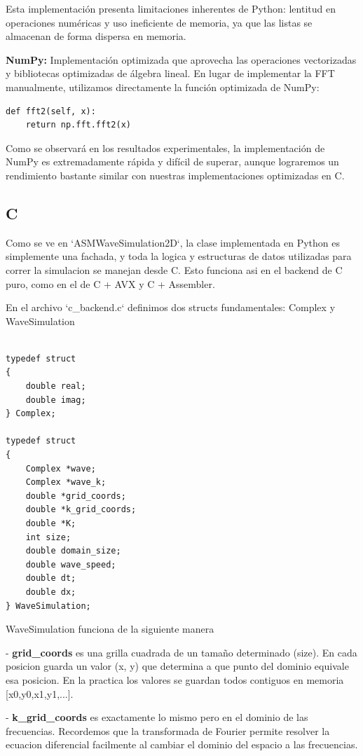 \documentclass[a4paper]{article}
\begin{document}
Esta implementación presenta limitaciones inherentes de Python: lentitud en operaciones numéricas y uso ineficiente de memoria, ya que las listas se almacenan de forma dispersa en memoria.

\textbf{NumPy:} Implementación optimizada que aprovecha las operaciones vectorizadas y bibliotecas optimizadas de álgebra lineal. En lugar de implementar la FFT manualmente, utilizamos directamente la función optimizada de NumPy:

\begin{verbatim}
def fft2(self, x):
    return np.fft.fft2(x)
\end{verbatim}

Como se observará en los resultados experimentales, la implementación de NumPy es extremadamente rápida y difícil de superar, aunque lograremos un rendimiento bastante similar con nuestras implementaciones optimizadas en C.

\subsection{C}
Como se ve en `ASMWaveSimulation2D`, la clase implementada en Python es simplemente una fachada, y toda la logica y estructuras de datos
utilizadas para correr la simulacion se manejan desde C. Esto funciona asi en el backend de C puro, como en el de C + AVX y C + Assembler.

En el archivo `c_backend.c` definimos dos structs fundamentales: Complex y WaveSimulation

\begin{verbatim}

typedef struct
{
    double real;
    double imag;
} Complex;
    
typedef struct
{
    Complex *wave;
    Complex *wave_k;
    double *grid_coords;
    double *k_grid_coords;
    double *K;
    int size;
    double domain_size;
    double wave_speed;
    double dt;
    double dx;
} WaveSimulation;

\end{verbatim}

WaveSimulation funciona de la siguiente manera

- \textbf{grid_coords} es una grilla cuadrada de un tamaño determinado (size). En cada posicion guarda un valor (x, y) que determina a que punto del dominio equivale
esa posicion. En la practica los valores se guardan todos contiguos en memoria [x0,y0,x1,y1,...].

- \textbf{k_grid_coords} es exactamente lo mismo pero en el dominio de las frecuencias. Recordemos que la transformada de Fourier permite resolver la ecuacion
diferencial facilmente al cambiar el dominio del espacio a las frecuencias.
\end{document}
